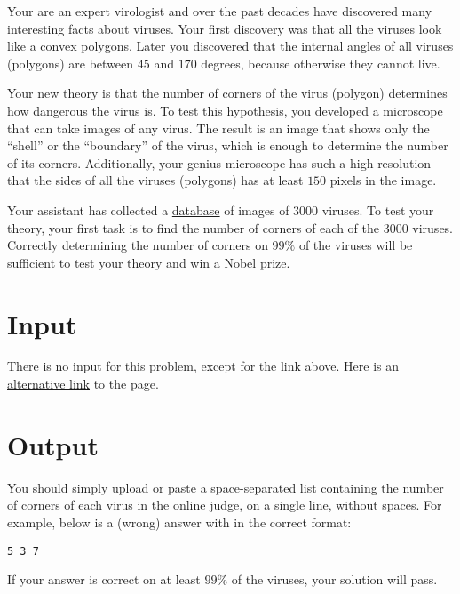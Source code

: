 Your are an expert virologist and over the past decades have discovered many interesting facts about viruses.
Your first discovery was that all the viruses look like a convex polygons.
Later you discovered that the internal angles of all viruses (polygons) are between $45$ and $170$ degrees, because otherwise they cannot live.

Your new theory is that the number of corners of the virus (polygon) determines how dangerous the virus is.
To test this hypothesis, you developed a microscope that can take images of any virus.
The result is an image that shows only the ``shell'' or the ``boundary'' of the virus, which is enough to determine the number of its corners.
Additionally, your genius microscope has such a high resolution that the sides of all the viruses (polygons) has at least $150$ pixels in the image.

Your assistant has collected a \href{http://ejudge.rau.am/ejudge/virus-shapes.zip}{database} of images of $3000$ viruses.
To test your theory, your first task is to find the number of corners of each of the $3000$ viruses.
Correctly determining the number of corners on $99\%$ of the viruses will be sufficient to test your theory and win a Nobel prize.

\section*{Input}
There is no input for this problem, except for the link above.
Here is an \href{http://167.71.248.201/ejudge/virus-shapes.zip}{alternative link} to the page.

\section*{Output}
You should simply upload or paste a space-separated list containing the number of corners of each virus in the online judge, on a single line, without spaces.
For example, below is a (wrong) answer with in the correct format:
\begin{center}
    \texttt{5 3 7}
\end{center}
If your answer is correct on at least $99\%$ of the viruses, your solution will pass.

%
%
%
